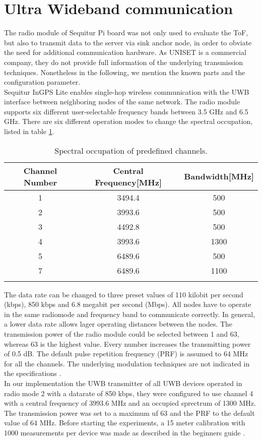 \section{Ultra Wideband communication}
The radio module of Sequitur Pi board was not only used  to evaluate the ToF, but also to transmit data to the server via sink anchor node, in order to obviate the need for additional communication hardware. As UNISET is a commercial company, they do not provide full information of the underlying transmission techniques. Nonetheless in the following, we mention the known parts and the configuration parameter.\\
\noindent\hspace*{5mm}%
Sequitur InGPS Lite enables single-hop wireless communication with the UWB interface between neighboring nodes of the same network. The radio module supports six different user-selectable frequency bands between 3.5 GHz and 6.5 GHz. There are six different operation modes to change the spectral occupation, listed in table \ref{tab:spectral_occupation}.\\
\begin{table}
\caption{Spectral occupation of predefined channels.}
\label{tab:spectral_occupation}
\centering
\begin{tabular}{c c c}
\toprule
\textbf{Channel Number} & \textbf{Central Frequency}[MHz] & \textbf{Bandwidth}[MHz]\\
\midrule
1 & 3494.4 & 500\\
2 & 3993.6 & 500\\
3 & 4492.8 & 500\\
4 & 3993.6 & 1300\\
5 & 6489.6 & 500\\
7 & 6489.6 & 1100\\
\bottomrule\\
\end{tabular}
\end{table}
The data rate can be changed to three preset values of 110 kilobit per second (kbps), 850 kbps and 6.8 megabit per second (Mbps). All nodes have to operate in the same radiomode and frequency band to communicate correctly. In general, a lower data rate allows lager operating distances between the nodes. The transmission power of the radio module could be selected between 1 and 63, whereas 63 is the highest value. Every number increases the transmitting power of 0.5 dB. The default pulse repetition frequency (PRF) is assumed to 64 MHz for all the channels. The underlying modulation techniques are not indicated in the specifications \cite{Usermanual} \cite{Beginnersguide}.\\
\noindent\hspace*{5mm}%
In our implementation the UWB transmitter of all UWB devices operated in radio mode 2 with a datarate of 850 kbps, they were configured to use channel 4 with a central frequency of 3993.6 MHz and an occupied sprectrum of 1300 MHz. The transmission power was set to a maximum uf 63 and the PRF to the default value of 64 MHz. Before starting the experiments, a 15 meter calibration with 1000 measurements per device was made as described in the beginners guide \cite{Beginnersguide}.